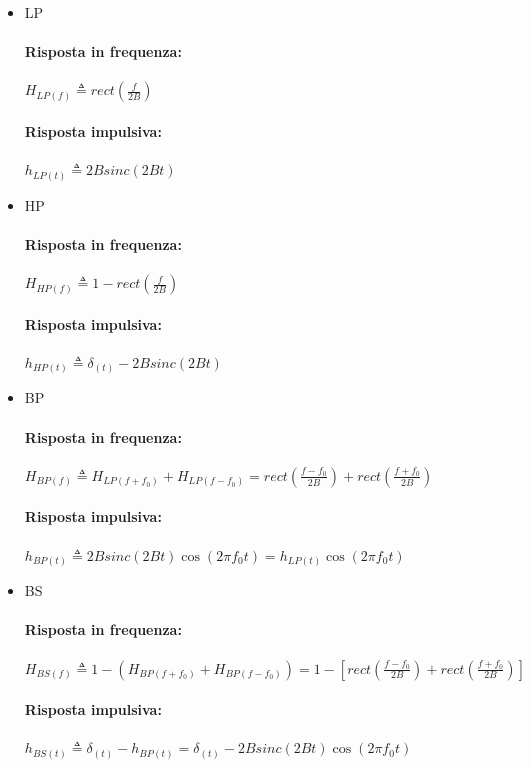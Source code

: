         \begin{itemize}
            \item {LP
                \paragraph{Risposta in frequenza:}
                    $H_{LP(f)}\triangleq rect\left(\frac{f}{2B}\right)  $
                \paragraph{Risposta impulsiva:}
                    $h_{LP(t)}\triangleq 2Bsinc(2Bt)  $
            }
            \item {HP
                \paragraph{Risposta in frequenza:}
                   $ H_{HP(f)}\triangleq 1 - rect\left(\frac{f}{2B}\right)  $
                \paragraph{Risposta impulsiva:}
                    $h_{HP(t)}\triangleq \delta_{(t)} - 2Bsinc(2Bt)  $
            }
            \item {BP
                \paragraph{Risposta in frequenza:}
                  $  H_{BP(f)}\triangleq H_{LP(f+f_0)} +H_{LP(f-f_0)} =  rect\left(\frac{f-f_0}{2B}\right) + rect\left(\frac{f+f_0}{2B}\right)  $
                \paragraph{Risposta impulsiva:}
                    $h_{BP(t)}\triangleq 2Bsinc(2Bt) \cos(2\pi f_0t) = h_{LP(t)}\cos(2\pi f_0t)   $
            }
            \item {BS
                \paragraph{Risposta in frequenza:}
                  $  H_{BS(f)}\triangleq 1 -(H_{BP(f+f_0)} +H_{BP(f-f_0)}) = 1- \left[ rect\left(\frac{f-f_0}{2B}\right) + rect\left(\frac{f+f_0}{2B}\right)\right]  $
                \paragraph{Risposta impulsiva:}
                    $h_{BS(t)}\triangleq \delta_{(t)} - h_{BP(t)} = \delta_{(t)} - 2Bsinc(2Bt) \cos(2\pi f_0t)$
            }
        \end{itemize}
